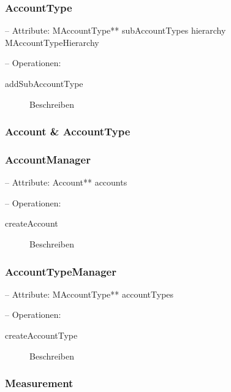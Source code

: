 

\subsubsection{AccountType}


-- Attribute: MAccountType** subAccountTypes hierarchy MAccountTypeHierarchy

-- Operationen:

\begin{description}
	\item[addSubAccountType] Beschreiben
\end{description}


\subsubsection{Account \& AccountType}



\subsubsection{AccountManager}


-- Attribute: Account** accounts

-- Operationen:

\begin{description}
	\item[createAccount] Beschreiben
\end{description}


\subsubsection{AccountTypeManager}


-- Attribute: MAccountType** accountTypes

-- Operationen:

\begin{description}
	\item[createAccountType] Beschreiben
\end{description}




\subsubsection{Measurement}

